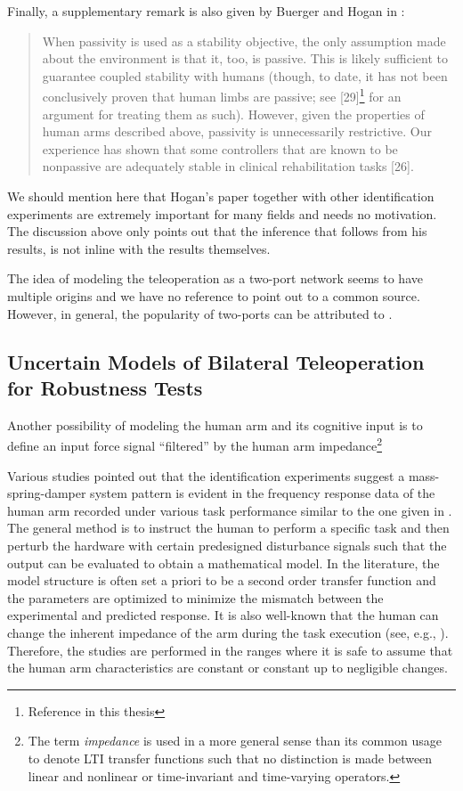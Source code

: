 \noindent Finally, a supplementary remark is also given by Buerger and Hogan in \cite{buergerhogan1}: 
\begin{quote}
When passivity is used as a stability objective, the only assumption
made about the environment is that it, too, is passive.
This is likely sufficient to guarantee coupled stability with humans
(though, to date, it has not been conclusively proven that
human limbs are passive; see [29]\footnote{Reference \cite{hogan89} in this thesis} for an argument for treating
them as such). However, given the properties of human arms
described above, passivity is unnecessarily restrictive. Our experience
has shown that some controllers that are known to be
nonpassive are adequately stable in clinical rehabilitation tasks [26].
\end{quote}


We should mention here that Hogan's paper together with other identification experiments are extremely important for many
fields and needs no motivation. The discussion above only points out that the inference that follows from his results, 
is not inline with the results themselves. 

The idea of modeling the teleoperation as a two-port network seems to have multiple origins and we have no reference to 
point out to a common source. However, in general, the popularity of two-ports can be attributed to 
\cite{andersonspong,nieslotine,rajuphd,hannaford89,yokokohjiyoshikawa}. 



\subsection{Uncertain Models of Bilateral Teleoperation for Robustness Tests}\label{sec:lit:uncmodel}

Another possibility of modeling the human arm and its cognitive input is to define an input force signal ``filtered'' by the 
human arm impedance\footnote{The term \emph{impedance} is used in a more general sense than its common usage to denote
LTI transfer functions such that no distinction is made between linear and nonlinear or time-invariant and time-varying 
operators.} 

Various studies pointed out that the identification experiments suggest a mass-spring-damper system pattern is evident
in the frequency response data of the human arm recorded under various task performance similar to the one given in \cite{hogan89}.
The general method is to instruct the human to perform a specific task and then perturb the hardware with certain predesigned
disturbance signals such that the output can be evaluated to obtain a mathematical model. In the literature, the model structure
is often set a priori to be a second order transfer function and the parameters are optimized to minimize the mismatch between
the experimental and predicted response. It is also well-known that the human can change the inherent impedance of the arm during
the task execution (see, e.g., \cite{tsujimorasso}). Therefore, the studies are performed in the ranges where it is safe to assume 
that the human arm characteristics are constant or constant up to negligible changes. 


